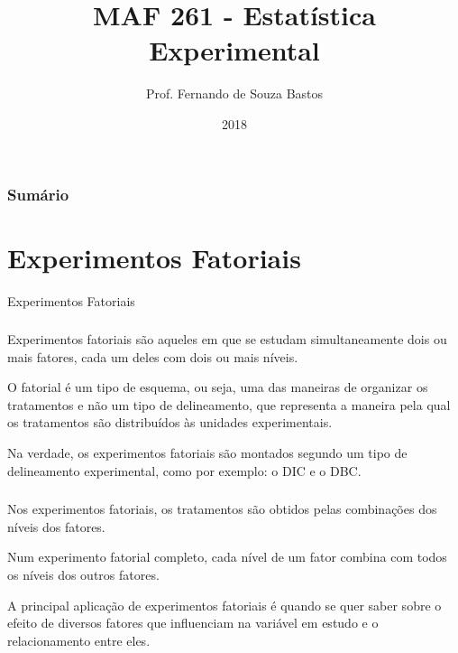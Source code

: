 \documentclass[14pt,aspectratio=1610]{beamer}
\title{MAF 261 - Estatística Experimental}
\author{Prof. Fernando de Souza Bastos}
\institute{Instituto de Ciências Exatas e Tecnológicas\texorpdfstring{\\ Universidade Federal de Viçosa}{}\texorpdfstring{\\ Campus UFV - Florestal}{}}
\date{2018}
\begin{document}


\frame{\titlepage}

\begin{frame}{}
\frametitle{\bf Sumário}
\tableofcontents
\end{frame}

\section{Experimentos Fatoriais}
\begin{frame}{Experimentos Fatoriais}
\frametitle{}
\begin{block}{}
\justifying
Experimentos fatoriais são aqueles em que se estudam simultaneamente
dois ou mais fatores, cada um deles com dois ou mais níveis.
\end{block}
\pause
\begin{block}{}
\justifying
O fatorial é um tipo de esquema, ou seja, uma das maneiras de organizar os tratamentos e não um tipo de delineamento, que representa a maneira pela qual os
tratamentos são distribuídos às unidades experimentais.
\end{block}
\pause
\begin{block}{}
\justifying
Na verdade, os experimentos fatoriais são montados segundo um tipo de delineamento
experimental, como por exemplo: o DIC e o DBC.
\end{block}
\end{frame}

\begin{frame}{}
\frametitle{}
\begin{block}{}
\justifying
Nos experimentos fatoriais, os tratamentos são obtidos pelas combinações
dos níveis dos fatores.
\end{block}
\pause
\begin{block}{}
\justifying
Num experimento fatorial completo, cada nível de um fator combina com todos os níveis dos outros fatores.
\end{block}
\pause
\begin{block}{}
\justifying
A principal aplicação de experimentos fatoriais é quando se quer saber sobre o efeito de diversos fatores que influenciam na variável em estudo e o relacionamento entre eles.
\end{block}
\end{frame}
\end{document}
